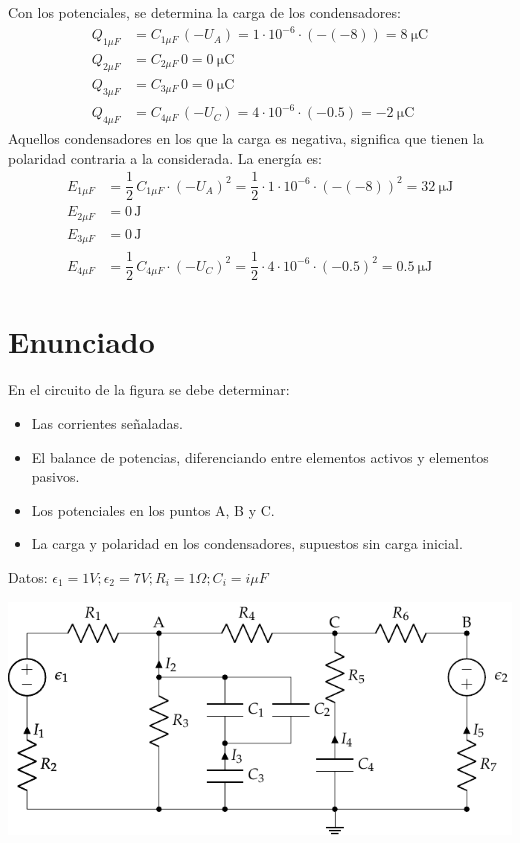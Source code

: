 Con los potenciales, se determina la carga de los condensadores:
\begin{align*}
  Q_{1\mu F}&=C_{1\mu F}\, (-U_{A}) = 1\cdot 10^{-6}\cdot (-(-8))=\qty{8}{\micro\coulomb}\\
  Q_{2\mu F}&=C_{2\mu F}\, 0 = \qty{0}{\micro\coulomb}\\
  Q_{3\mu F}&=C_{3\mu F}\, 0 = \qty{0}{\micro\coulomb}\\
  Q_{4\mu F}&=C_{4\mu F}\, (-U_C) = 4\cdot 10^{-6}\cdot (-0.5)=\qty{-2}{\micro\coulomb}
\end{align*}
Aquellos condensadores en los que la carga es negativa, significa que
tienen la polaridad contraria a la considerada. La energía es:
\begin{align*}
  E_{1\mu F}&=\dfrac{1}{2}\,C_{1\mu F}\cdot (-U_{A})^2 = \dfrac{1}{2}\cdot 1\cdot 10^{-6}\cdot (-(-8))^2=\qty{32}{\micro\joule}\\
  E_{2\mu F}&=0\,\text{J}\\
  E_{3\mu F}&=0\,\text{J}\\
  E_{4\mu F}&=\dfrac{1}{2}\,C_{4\mu F}\cdot (-U_{C})^2 = \dfrac{1}{2}\cdot 4\cdot 10^{-6}\cdot (-0.5)^2=\qty{0.5}{\micro\joule}
\end{align*}

\section{Enunciado}
En el circuito de la figura se debe determinar:
\begin{itemize}
\item Las corrientes señaladas.
\item El balance de potencias, diferenciando entre elementos activos y
  elementos pasivos.
\item Los potenciales en los puntos A, B y C.
\item La carga y polaridad en los condensadores, supuestos sin carga
  inicial.
\end{itemize}
Datos:
$\epsilon_1 ={1}V; \epsilon_2 ={7}V; R_i = {1}\Omega; C_i = {i}{\mu
  F}$

\begin{center}
  \includegraphics{figuras/mallas_agrupacion_condensadores.pdf}
\end{center}


